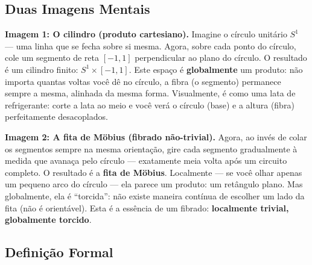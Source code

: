 \subsection{Duas Imagens Mentais}

\textbf{Imagem 1: O cilindro (produto cartesiano).} Imagine o c\'irculo unit\'ario
$S^1$ --- uma linha que se fecha sobre si mesma. Agora, sobre cada ponto do
c\'irculo, cole um segmento de reta $[-1, 1]$ perpendicular ao plano do
c\'irculo. O resultado \'e um cilindro finito: $S^1 \times [-1, 1]$. Este
espa\c{c}o \'e \textbf{globalmente} um produto: n\~ao importa quantas voltas
voc\^e d\^e no c\'irculo, a fibra (o segmento) permanece sempre a mesma,
alinhada da mesma forma. Visualmente, \'e como uma lata de refrigerante: corte
a lata ao meio e voc\^e ver\'a o c\'irculo (base) e a altura (fibra)
perfeitamente desacoplados.

\textbf{Imagem 2: A fita de M\"obius (fibrado n\~ao-trivial).} Agora, ao inv\'es
de colar os segmentos sempre na mesma orienta\c{c}\~ao, gire cada segmento
gradualmente \`a medida que avana\c{c}a pelo c\'irculo --- exatamente meia volta
ap\'os um circuito completo. O resultado \'e a \textbf{fita de M\"obius}.
Localmente --- se voc\^e olhar apenas um pequeno arco do c\'irculo --- ela
parece um produto: um ret\^angulo plano. Mas globalmente, ela \'e ``torcida'':
n\~ao existe maneira cont\'inua de escolher um lado da fita (n\~ao \'e
orient\'avel). Esta \'e a ess\^encia de um fibrado: \textbf{localmente trivial,
globalmente torcido}.

\subsection{Defini\c{c}\~ao Formal}

